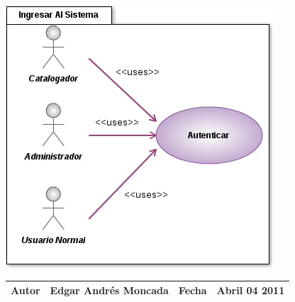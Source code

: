 \begin{minipage}[c]{1\linewidth}
	\centering
	\includegraphics[scale=.6]{casosUso/CUAutenticar}\\[0.5cm]
               
    \begin{tabular}{|p{}|p{}|p{}|p{}|}
    \hline
    {\bf Autor} & {Edgar Andrés Moncada} & {\bf Fecha} & {Abril 04 2011}\\
    \hline
    \end{tabular}                
\end{minipage}

       
